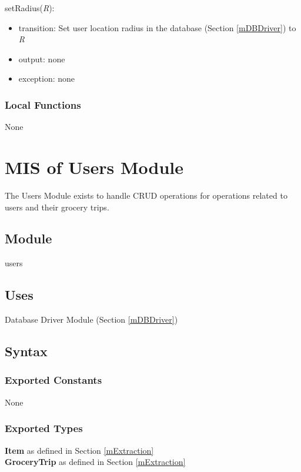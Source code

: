 \documentclass[12pt, titlepage]{article}
\begin{document}
\noindent setRadius(\textit{R}):
\begin{itemize}
\item transition: Set user location radius in the database (Section \ref{mDBDriver}) to \textit{R}
\item output: none
\item exception: none
\end{itemize}


\subsubsection{Local Functions}
None

\newpage

\section{MIS of Users Module} \label{mUsers} 
The Users Module exists to handle CRUD operations for operations related to users and their grocery trips.

\subsection{Module}

users

\subsection{Uses}

 Database Driver Module (Section \ref{mDBDriver}) 

\subsection{Syntax}

\subsubsection{Exported Constants}
None

\subsubsection{Exported Types}
\textbf{Item} as defined in Section \ref{mExtraction} \\

\noindent \textbf{GroceryTrip} as defined in Section \ref{mExtraction} \\
\end{document}
